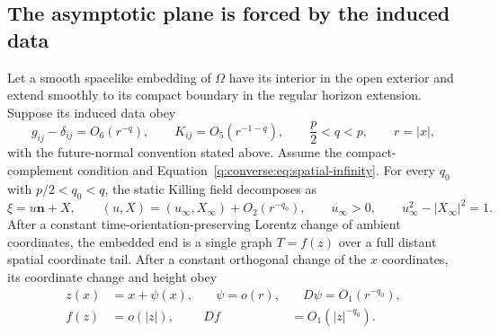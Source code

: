 \subsection{The asymptotic plane is forced by the induced data}

\begin{lemma}
\label{q:converse:lem:plane}
Let a smooth spacelike embedding of $\Omega$ have its interior in the
open exterior and extend smoothly to its compact boundary in the
regular horizon extension.  Suppose its induced data obey
\[
 g_{ij}-\delta_{ij}=O_6(r^{-q}),\qquad
 K_{ij}=O_5(r^{-1-q}),\qquad
 \frac p2<q<p,
 \qquad r=|x|,
\]
with the future-normal convention stated above.
Assume the compact-complement condition and
Equation~\eqref{q:converse:eq:spatial-infinity}.
For every $q_0$ with $p/2<q_0<q$, the static Killing field decomposes as
\begin{equation}
 \xi=u\mathbf n+X,\qquad
 (u,X)=(u_\infty,X_\infty)+O_2(r^{-q_0}),\qquad
 u_\infty>0,\qquad u_\infty^2-|X_\infty|^2=1.
 \label{q:converse:eq:kid-limit}
\end{equation}
After a constant time-orientation-preserving Lorentz change of ambient
coordinates, the embedded end is a single graph $T=f(z)$ over a full
distant spatial coordinate tail.  After a constant orthogonal change of
the $x$ coordinates, its coordinate change and height obey
\begin{equation}
 \begin{aligned}
 z(x)&=x+\psi(x),&\quad \psi=o(r),&\quad
 D\psi=O_1(r^{-q_0}),\\
 f(z)&=o(|z|),& Df&=O_1(|z|^{-q_0}).
 \end{aligned}
 \label{q:converse:eq:graph-estimates}
\end{equation}
\end{lemma}


